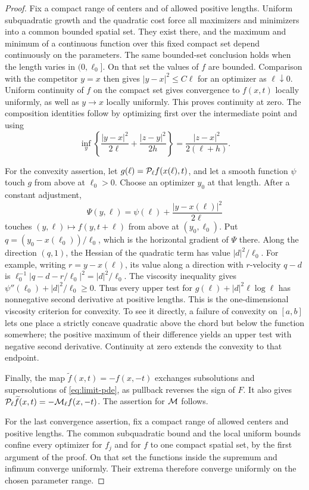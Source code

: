 \begin{proof}
Fix a compact range of centers and of allowed positive lengths.
Uniform subquadratic growth and the quadratic cost force all
maximizers and minimizers into a common bounded spatial set.
They exist there, and the maximum and minimum of a continuous
function over this fixed compact set depend continuously on the
parameters. The same bounded-set conclusion holds when the
length varies in $(0,\ell_0]$. On that set the values of $f$ are
bounded. Comparison with the competitor $y=x$ then gives
$|y-x|^2\le C\ell$ for an optimizer as $\ell\downarrow0$.
Uniform continuity of $f$ on the compact set gives convergence
to $f(x,t)$ locally uniformly, as well as $y\to x$ locally
uniformly. This proves continuity at zero. The composition
identities follow by optimizing first over the intermediate
point and using
\[
  \inf_y\left\{\frac{|y-x|^2}{2\ell}
           +\frac{|z-y|^2}{2h}\right\}
       =\frac{|z-x|^2}{2(\ell+h)}.
\]

For the convexity assertion, let
$g(\ell)=\mathcal{P}_\ell f(x(\ell),t)$, and let a smooth function
$\psi$ touch $g$ from above at $\ell_0>0$. Choose an optimizer
$y_0$ at that length. After a constant adjustment,
\[
  \Psi(y,\ell)=\psi(\ell)+\frac{|y-x(\ell)|^2}{2\ell}
\]
touches $(y,\ell)\mapsto f(y,t+\ell)$ from above at
$(y_0,\ell_0)$. Put $q=(y_0-x(\ell_0))/\ell_0$, which is the
horizontal gradient of $\Psi$ there. Along the direction
$(q,1)$, the Hessian of the quadratic term has value
$|d|^2/\ell_0$. For example, writing $r=y-x(\ell)$, its value
along a direction with $r$-velocity $q-d$ is
$\ell_0^{-1}|q-d-r/\ell_0|^2=|d|^2/\ell_0$.
The viscosity inequality gives
$\psi''(\ell_0)+|d|^2/\ell_0\ge0$. Thus every upper test for
$g(\ell)+|d|^2\ell\log\ell$ has nonnegative second derivative
at positive lengths. This is the one-dimensional viscosity
criterion for convexity. To see it directly, a failure of
convexity on $[a,b]$ lets one place a strictly concave quadratic
above the chord but below the function somewhere; the positive
maximum of their difference yields an upper test with negative
second derivative. Continuity at zero extends the convexity to
that endpoint.

Finally, the map $\widetilde f(x,t)=-f(x,-t)$ exchanges
subsolutions and supersolutions of \eqref{eq:limit-pde}, as
pullback reverses the sign of $F$. It also gives
$\mathcal{P}_\ell\widetilde f(x,t)=-\mathcal{M}_\ell f(x,-t)$.
The assertion for $\mathcal{M}$ follows.

For the last convergence assertion, fix a compact range of allowed centers
and positive lengths. The common subquadratic bound and the local uniform
bounds confine every optimizer for $f_j$ and for $f$ to one compact spatial
set, by the first argument of the proof. On that set the functions inside
the supremum and infimum converge uniformly. Their extrema therefore
converge uniformly on the chosen parameter range.
\end{proof}

